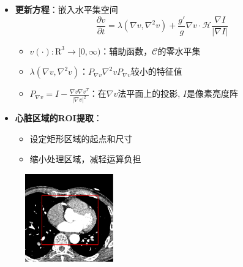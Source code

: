 \begin{frame}
\begin{itemize}
\item \textbf{更新方程}：嵌入水平集空间
\begin{equation*}
\frac{\partial v}{\partial t} = \lambda \left( \nabla v, \nabla^2 v \right) + \frac{g'}{g} \nabla v \cdot \mathcal{H} \frac{\nabla I}{ \left| \nabla I \right| }
\end{equation*}
\begin{itemize}
\item $v(\cdot): \mathrm{R}^3 \rightarrow [0, \infty)$：辅助函数，$\mathcal{C}$的零水平集
\item $\lambda \left( \nabla v, \nabla^2 v \right)$：$P_{\nabla v} \nabla^{2} v P_{\nabla v}$较小的特征值
\item $P_{\nabla v} = I - \frac{\nabla v \nabla v^{T}}{\left| \nabla v \right|^{2}}$：在$\nabla v$法平面上的投影, $I$是像素亮度阵
\end{itemize}
\end{itemize}
\end{frame}

\begin{frame}
\begin{itemize}
  \item \textbf{心脏区域的ROI提取}：
  \begin{itemize}
  \pause \item 设定矩形区域的起点和尺寸
  \pause \item 缩小处理区域，减轻运算负担
  \end{itemize}
\end{itemize}
\begin{figure}[t]
\centering
\includegraphics[width=1.5in]{../../Figures/coronary/ROI_Extraction}
\end{figure}
\end{frame}

